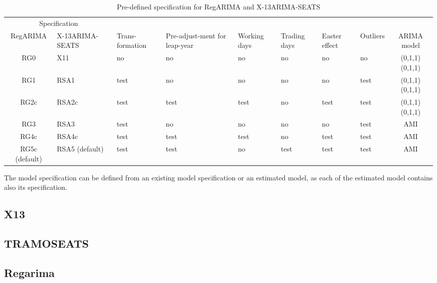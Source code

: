 \documentclass[article]{jss}
\begin{document}
\begin{table}

\caption{\label{tab:unnamed-chunk-7}\label{tab:pre_def_x13}Pre-defined specification for RegARIMA and X-13ARIMA-SEATS}
\centering
\fontsize{7}{9}\selectfont
\begin{tabular}[t]{c>{\centering\arraybackslash}p{1.7cm}>{\centering\arraybackslash}p{}>{\centering\arraybackslash}p{1.4cm}>{\centering\arraybackslash}p{0.9cm}>{\centering\arraybackslash}p{0.9cm}>{\centering\arraybackslash}p{0.9cm}>{\centering\arraybackslash}p{0.9cm}c}
\toprule
\multicolumn{2}{c}{Specification} & \multicolumn{1}{c}{} \\
\cmidrule(l{2pt}r{2pt}){1-2}
RegARIMA & X-13ARIMA-SEATS & Trans-formation & Pre-adjust-ment for leap-year & Working days & Trading days & Easter effect & Outliers & ARIMA model\\
\midrule
RG0 & X11 & no & no & no & no & no & no & (0,1,1)(0,1,1)\\
RG1 & RSA1 & test & no & no & no & no & test & (0,1,1)(0,1,1)\\
RG2c & RSA2c & test & test & test & no & test & test & (0,1,1)(0,1,1)\\
RG3 & RSA3 & test & no & no & no & no & test & AMI\\
RG4c & RSA4c & test & test & test & no & test & test & AMI\\
RG5c (default) & RSA5 (default) & test & test & no & test & test & test & AMI\\
\bottomrule
\end{tabular}
\end{table}

The model specification can be defined from an existing model
specification or an estimated model, as each of the estimated model
contains also its specification.

\hypertarget{x13}{%
\subsection{X13}\label{x13}}

\hypertarget{tramoseats}{%
\subsection{TRAMOSEATS}\label{tramoseats}}

\hypertarget{regarima-1}{%
\subsection{Regarima}\label{regarima-1}}
\end{document}

